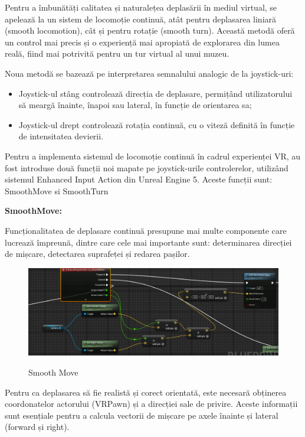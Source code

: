 Pentru a îmbunătăți calitatea și naturalețea deplasării în mediul virtual, se apelează la un sistem de locomoție continuă, atât pentru deplasarea liniară (smooth locomotion), cât și pentru rotație (smooth turn). Această metodă oferă un control mai precis și o experiență mai apropiată de explorarea din lumea reală, fiind mai potrivită pentru un tur virtual al unui muzeu.

Noua metodă se bazează pe interpretarea semnalului analogic de la joystick-uri:
\begin{itemize}
\item Joystick-ul stâng controlează direcția de deplasare, permițând utilizatorului să meargă înainte, înapoi sau lateral, în funcție de orientarea sa;
\item Joystick-ul drept controlează rotația continuă, cu o viteză definită în funcție de intensitatea devierii.
\end{itemize}

Pentru a implementa sistemul de locomoție continuă în cadrul experienței VR, au fost introduse două funcții noi mapate pe joystick-urile controlerelor, utilizând sistemul Enhanced Input Action din Unreal Engine 5. Aceste funcții sunt: SmoothMove si SmoothTurn

\textbf{SmoothMove:}

Funcționalitatea de deplasare continuă presupune mai multe componente care lucrează împreună, dintre care cele mai importante sunt: determinarea direcției de mișcare, detectarea suprafeței și redarea pașilor.

\begin{figure} [htp] 
\centering 
\includegraphics [width=12cm]
{continut/capitol3/figuri/SmoothMove.png} 
\label{fig:VR_Pawn} 
    \caption{Smooth Move}
\end{figure}

Pentru ca deplasarea să fie realistă și corect orientată, este necesară obținerea coordonatelor actorului (VRPawn) și a direcției sale de privire. Aceste informații sunt esențiale pentru a calcula vectorii de mișcare pe axele înainte și lateral (forward și right).


